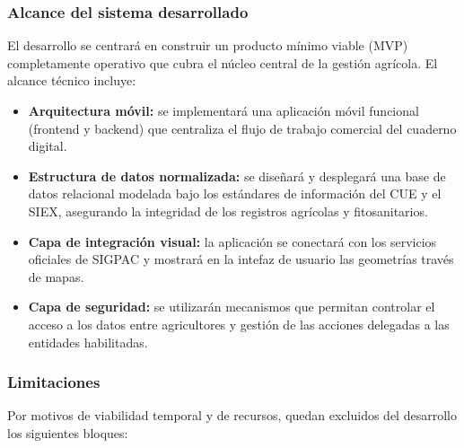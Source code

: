 \subsubsection{Alcance del sistema desarrollado}

El desarrollo se centrará en construir un producto mínimo viable (MVP) completamente operativo que cubra el núcleo central de la gestión agrícola. El alcance técnico incluye:

\begin{itemize}
    \item \textbf{Arquitectura móvil:} se implementará una aplicación móvil funcional (frontend y backend) que centraliza el flujo de trabajo comercial del cuaderno digital.
    
    \item \textbf{Estructura de datos normalizada:} se diseñará y desplegará una base de datos relacional modelada bajo los estándares de información del CUE y el SIEX, asegurando la 
    integridad de los registros agrícolas y fitosanitarios.

    \item \textbf{Capa de integración visual:} la aplicación se conectará con los servicios oficiales de SIGPAC y mostrará en la intefaz de usuario las geometrías través de mapas.
    
    \item \textbf{Capa de seguridad:} se utilizarán mecanismos que permitan controlar el acceso a los datos entre agricultores y gestión de las acciones delegadas a las entidades habilitadas.
\end{itemize}

\subsubsection{Limitaciones}

Por motivos de viabilidad temporal y de recursos, quedan excluidos del desarrollo los siguientes bloques:

